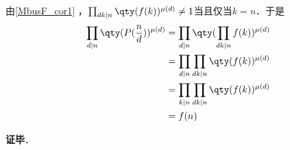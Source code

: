 由\autoref{MbusF_cor1} ，$\prod_{dk\mid n}\qty(f(k))^{\mu(d)}\neq 1$当且仅当$k=n$．于是
\begin{equation}
\begin{aligned}
\prod_{d\mid n}\qty(P(\frac{n}{d}))^{\mu(d)}&=\prod_{d\mid n}\qty(\prod_{dk\mid n}f(k))^{\mu(d)}\\
&=\prod_{d\mid n}\prod_{dk\mid n}\qty(f(k))^{\mu(d)}\\
&=\prod_{k\mid n}\prod_{dk\mid n}\qty(f(k))^{\mu(d)}\\
&=f(n)
\end{aligned}
\end{equation}

\textbf{证毕}．

















